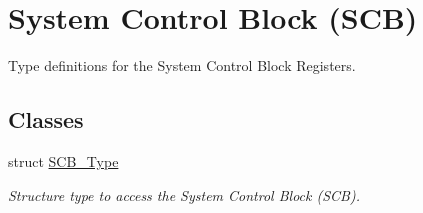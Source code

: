\hypertarget{group___c_m_s_i_s___s_c_b}{\section{System Control Block (S\-C\-B)}
\label{group___c_m_s_i_s___s_c_b}
}


Type definitions for the System Control Block Registers.  


\subsection*{Classes}
\begin{DoxyCompactItemize}
\item 
struct \hyperlink{struct_s_c_b___type}{S\-C\-B\-\_\-\-Type}
\begin{DoxyCompactList}\small\item\em Structure type to access the System Control Block (S\-C\-B). \end{DoxyCompactList}\end{DoxyCompactItemize}
